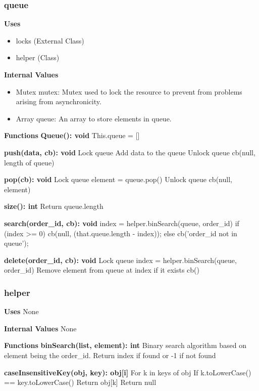 \documentclass [10pt]{article}
\begin{document}

\subsubsection{queue}
\textbf{Uses}
\begin{itemize}
	\item locks (External Class)
	\item helper (Class)
\end{itemize}

\textbf{Internal Values}
\begin{itemize}
	\item Mutex mutex: Mutex used to lock the resource to prevent from problems arising from asynchronicity.
	\item Array queue: An array to store elements in queue.
\end{itemize}

\textbf{Functions}
\textbf{Queue(): void}
This.queue = []

\textbf{push(data, cb): void}
Lock queue
Add data to the queue
Unlock queue
cb(null, length of queue)

\textbf{pop(cb): void}
Lock queue
element = queue.pop()
Unlock queue
cb(null, element)

\textbf{size(): int}
Return queue.length

\textbf{search(order\_id, cb): void}
index = helper.binSearch(queue, order\_id)
if (index >= 0) {
	cb(null, (that.queue.length - index));
} else {
	cb('order\_id not in queue');
}

\textbf{delete(order\_id, cb): void}
Lock queue
index = helper.binSearch(queue, order\_id)
Remove element from queue at index if it exists
cb()


\subsubsection{helper}
\textbf{Uses}
None

\textbf{Internal Values}
None

\textbf{Functions}
\textbf{binSearch(list, element): int}
Binary search algorithm based on element being the order\_id.
Return index if found or -1 if not found

\textbf{caseInsensitiveKey(obj, key): obj[i]}
For k in keys of obj
	If k.toLowerCase() == key.toLowerCase()
		Return obj[k]
Return null
\end{document}
